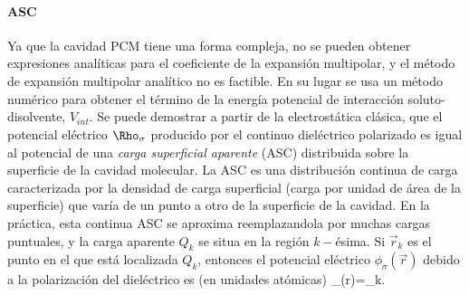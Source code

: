 \paragraph{ASC} Ya que la cavidad PCM tiene una forma compleja, no se
pueden obtener expresiones anal\'iticas para el coeficiente de la
expansi\'on multipolar, y el m\'etodo de expansi\'on multipolar 
anal\'itico no es factible. En su lugar se usa un m\'etodo num\'erico
para obtener el t\'ermino de la energ\'ia potencial de interacci\'on
soluto-disolvente, $\hat V_{int}$. Se puede demostrar a partir de la
electrost\'atica cl\'asica, que el potencial el\'ectrico 
$\Rho_{\sigma}$ producido por el continuo diel\'ectrico polarizado es
igual al potencial de una {\it carga superficial aparente} (ASC) 
distribuida sobre la superficie de la cavidad molecular. La ASC es 
una distribuci\'on continua de carga caracterizada por la densidad 
de carga superficial (carga por unidad de \'area de la superficie) 
que var\'ia de un punto a otro de la superficie de la cavidad. En la
pr\'actica, esta continua ASC se aproxima reemplazandola por muchas
cargas puntuales, y la carga aparente $Q_k$ se situa en la regi\'on
$k-$\'esima. Si $\vec r_k$ es el punto en el que est\'a localizada
$Q_k$, entonces el potencial el\'ectrico $\phi_{\sigma}(\vec r)$ 
debido a la polarizaci\'on  del diel\'ectrico es (en unidades 
at\'omicas)
\be
\phi_{\sigma}(\vec r)=\sum_k.
\ee


